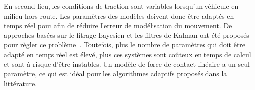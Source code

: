 En second lieu, les conditions de traction sont variables lorsqu'un véhicule en milieu hors route.
Les paramètres des modèles doivent donc être adaptés en temps réel pour afin de réduire l'erreur de modélisation du mouvement.
De approches basées sur le fitrage Bayesien et les filtres de Kalman ont été proposés pour règler ce problème~\citep{Pentzer2014}.
Toutefois, plus le nombre de paramètres qui doit être adapté en temps réel est élevé, plus ces systèmes sont coûteux en temps de calcul et sont à risque d'être instables.
Un modèle de force de contact linéaire a un seul paramètre, ce qui est idéal pour les algorithmes adaptifs proposés dans la littérature.
